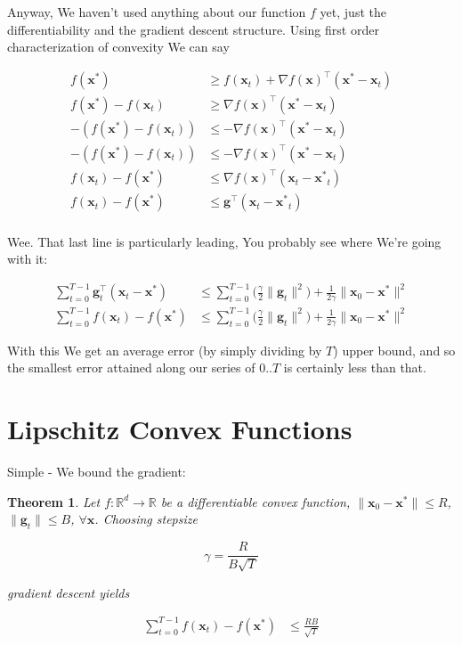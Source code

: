 \documentclass{article}
\newtheorem{theorem}{Theorem}[section]
\begin{document}
	Anyway, We haven't used anything about our function $f$ yet, just the differentiability and the gradient descent structure.  Using first order characterization of convexity We can say
	
	\begin{align*}
		f(\mathbf{x}^*) &\ge f(\mathbf{x}_t) + \nabla f(\mathbf{x})^\top (\mathbf{x^*-\mathbf{x}}_t)\\
		f(\mathbf{x}^*) - f(\mathbf{x}_t) &\ge  \nabla f(\mathbf{x})^\top (\mathbf{x^*-\mathbf{x}}_t)\\
		-( f(\mathbf{x}^*) - f(\mathbf{x}_t)) &\le  - \nabla f(\mathbf{x})^\top (\mathbf{x^*-\mathbf{x}}_t)\\
		-( f(\mathbf{x}^*) - f(\mathbf{x}_t)) &\le  - \nabla f(\mathbf{x})^\top (\mathbf{x^*-\mathbf{x}}_t)\\
		f(\mathbf{x}_t) - f(\mathbf{x}^*)&\le  \nabla f(\mathbf{x})^\top (\mathbf{x}_t - \mathbf{x^*}_t)\\
		f(\mathbf{x}_t) - f(\mathbf{x}^*)&\le  \mathbf{g}^\top (\mathbf{x}_t - \mathbf{x^*}_t)\\
	\end{align*}
	
	Wee. That last line is particularly leading, You probably see where We're going with it:
	
	\begin{align*}
		\sum^{T-1}_{t=0} \mathbf{g}_t^\top (\mathbf{x}_t - \mathbf{x}^*) &\le \sum^{T-1}_{t=0} \bigg(  \frac{\gamma}{2} \|\mathbf{g}_t\|^2\bigg) + \frac{1}{2\gamma} \|\mathbf{x}_0 - \mathbf{x}^*\|^2\\
		\sum^{T-1}_{t=0}f(\mathbf{x}_t) - f(\mathbf{x}^*) &\le \sum^{T-1}_{t=0} \bigg(  \frac{\gamma}{2} \|\mathbf{g}_t\|^2\bigg) + \frac{1}{2\gamma} \|\mathbf{x}_0 - \mathbf{x}^*\|^2
	\end{align*}
	
	With this We get an average error (by simply dividing by $T$) upper bound, and so the smallest error attained along our series of 0..$T$ is certainly less than that.
	
\section{Lipschitz Convex Functions}

	Simple - We bound the gradient:
	
	\begin{theorem}
		Let $f:\mathbb{R}^d\to\mathbb{R}$ be a differentiable convex function, $\|\mathbf{x}_0-\mathbf{x^*}\| \le R$, $\|\mathbf{g}_t\|\le B$, $\forall\mathbf{x}$. Choosing stepsize
		
		\[ \gamma = \frac{R}{B\sqrt{T}} \]
		
		gradient descent yields
		
		\begin{align*}
		\sum^{T-1}_{t=0}f(\mathbf{x}_t) - f(\mathbf{x}^*) &\le \frac{RB}{\sqrt{T}}
	\end{align*}
	
	\end{theorem}
	
\end{document}
